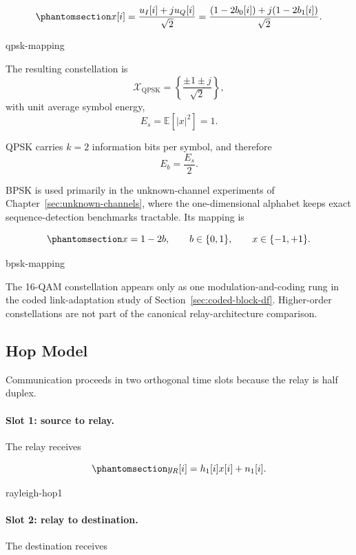 \begin{equation}\protect\phantomsection\label{eq:qpsk-mapping}
x[i]
=
\frac{u_I[i]+j u_Q[i]}{\sqrt{2}}
=
\frac{(1-2b_0[i])+j(1-2b_1[i])}{\sqrt{2}}.
\end{equation}
{\protect\numberline{\theequation}\quad qpsk-mapping}

The resulting constellation is
\[
\mathcal{X}_{\mathrm{QPSK}}
=
\left\{
\frac{\pm1\pm j}{\sqrt{2}}
\right\},
\]
with unit average symbol energy,
\[
E_s=\mathbb{E}[|x|^2]=1.
\]

QPSK carries $k=2$ information bits per symbol, and therefore
\[
E_b=\frac{E_s}{2}.
\]

BPSK is used primarily in the unknown-channel experiments of
Chapter~\ref{sec:unknown-channels}, where the one-dimensional alphabet
keeps exact sequence-detection benchmarks tractable. Its mapping is

\begin{equation}\protect\phantomsection\label{eq:bpsk-mapping}
x=1-2b,
\qquad
b\in\{0,1\},
\qquad
x\in\{-1,+1\}.
\end{equation}
{\protect\numberline{\theequation}\quad bpsk-mapping}

The 16-QAM constellation appears only as one modulation-and-coding rung
in the coded link-adaptation study of
Section~\ref{sec:coded-block-df}. Higher-order constellations are not
part of the canonical relay-architecture comparison.


\subsection{Hop Model}\label{sec:hop-model}
\label{sec:two-hop-relay-model}

Communication proceeds in two orthogonal time slots because the relay
is half duplex.

\paragraph{Slot 1: source to relay.}
The relay receives

\begin{equation}\protect\phantomsection\label{eq:rayleigh-hop1}
y_R[i]
=
h_1[i]x[i]+n_1[i].
\end{equation}
{\protect\numberline{\theequation}\quad rayleigh-hop1}

\paragraph{Slot 2: relay to destination.}
The destination receives

